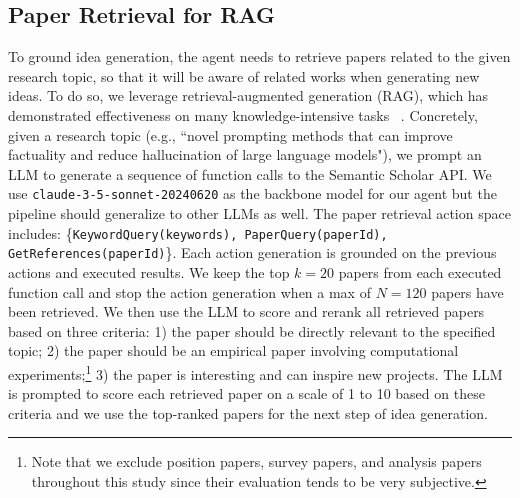 \subsection{Paper Retrieval for RAG}
To ground idea generation, the agent needs to retrieve papers related to the given research topic, so that it will be aware of related works when generating new ideas. 
To do so, we leverage retrieval-augmented generation (RAG), which has demonstrated effectiveness on many knowledge-intensive tasks ~\cite{Lewis2020RetrievalAugmentedGF,Shi2023REPLUGRB}. 
Concretely, given a research topic (e.g., ``novel prompting methods that can improve factuality and reduce hallucination of
large language models"), we prompt an LLM to generate a sequence of function calls to the Semantic Scholar API. We use \texttt{claude-3-5-sonnet-20240620} as the backbone model for our agent but the pipeline should generalize to other LLMs as well.  The paper retrieval action space includes: \{\texttt{KeywordQuery(keywords), PaperQuery(paperId), GetReferences(paperId)}\}. Each action generation is grounded on the previous actions and executed results. We keep the top $k = 20$ papers from each executed function call and stop the action generation when a max of $N = 120$ papers have been retrieved. We then use the LLM to score and rerank all retrieved papers based on three criteria: 1) the paper should be directly relevant to the specified topic; 2) the paper should be an empirical paper involving computational experiments;\footnote{Note that we exclude position papers, survey papers, and analysis papers throughout this study since their evaluation tends to be very subjective.} 3) the paper is interesting and can inspire new projects. The LLM is prompted to score each retrieved paper on a scale of 1 to 10 based on these criteria and we use the top-ranked papers for the next step of idea generation. 

